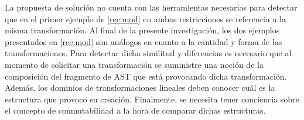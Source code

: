 \begin{recomendations}
\begin{enumerate}
      La propuesta de solución no cuenta con las herramientas necesarias para detectar que en el primer ejemplo de 
      \ref{rec:mod} en ambas restricciones se referencia a la misma transformación. Al final de la presente 
      investigación, los dos ejemplos presentados en \ref{rec:mod} son análogos en cuanto a la cantidad y forma de las 
      transformaciones. Para detectar dicha similitud y diferencias es necesario que al momento de solicitar una 
      transformación se suministre una noción de la composición del fragmento de AST que está provocando dicha 
      transformación. Además, los dominios de transformaciones lineales deben conocer cuál es la estructura que 
      provoco su creación. Finalmente, se necesita tener conciencia sobre el concepto de conmutabilidad a la 
      hora de comparar dichas estructuras.



    \end{enumerate}
\end{recomendations}
